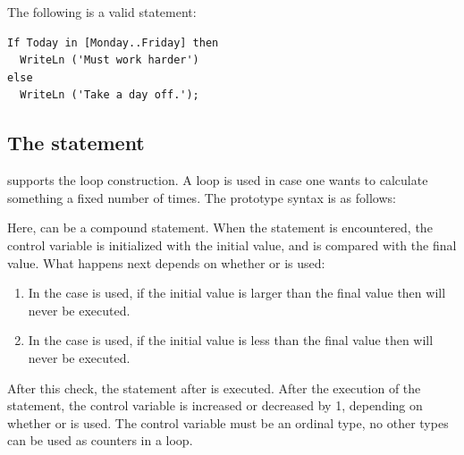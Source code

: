 The following is a valid statement:
\begin{verbatim}
If Today in [Monday..Friday] then
  WriteLn ('Must work harder')
else
  WriteLn ('Take a day off.');
\end{verbatim}

\subsection{The  statement}
\fpc supports the  loop construction. A  loop is used in case
one wants to calculate something a fixed number of times.
The prototype syntax is as follows:

Here,  can be a compound statement.
When the  statement is encountered, the control variable is initialized with
the initial value, and is compared with the final value.
What happens next depends on whether  or  is used:
\begin{enumerate}
\item In the case  is used, if the initial value is larger than the final
value then  will never be executed.
\item In the case  is used, if the initial value is less than the final
value then  will never be executed.
\end{enumerate}
After this check, the statement after  is executed. After the
execution of the statement, the control variable is increased or decreased
by 1, depending on whether  or  is used.
The control variable must be an ordinal type, no other
types can be used as counters in a loop.

